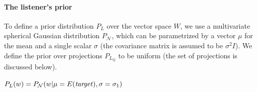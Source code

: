 \documentclass[9pt,twocolumn,twoside,lineno]{pnas-new}
\begin{document}
		


	





		
	







	\paragraph{The listener's prior} 

		To define a prior distribution $P_L$ over the vector space $W$, we use a multivariate spherical Gaussian distribution $P_{\mathcal{N}}$, which can be parametrized by a vector $\mu$ for the mean and a single scalar $\sigma$ (the covariance matrix is assumed to be $\sigma^2 I$). We define the prior over projections $P_{L_Q}$ to be uniform (the set of projections is discussed below).

		\begin{examples}
		
		\item $P_L(w) = P_{\mathcal{N}}(w\vert\mu=E(\textrm{\emph{target}}),\sigma=\sigma_1)$ \label{vect:prior}
		\end{examples}
\end{document}
